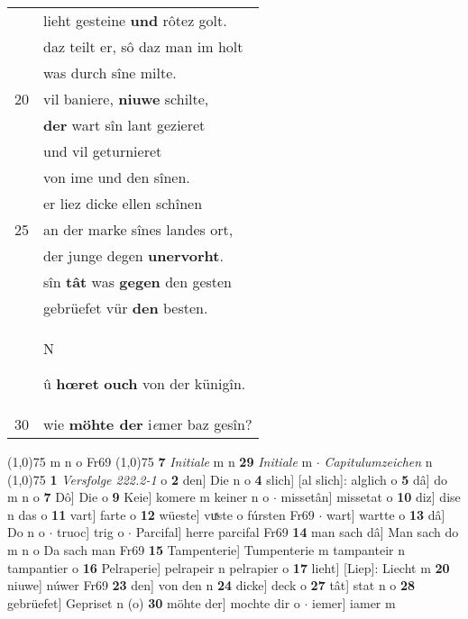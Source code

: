 \documentclass[8pt,a4paper,notitlepage]{article}
\begin{document}
\begin{table}[ht]
\begin{minipage}[t]{0.5\linewidth}
\begin{tabular}{rl}
 & lieht gesteine \textbf{und} rôtez golt.\\ 
 & daz teilt er, sô daz man im holt\\ 
 & was durch sîne milte.\\ 
20 & vil baniere, \textbf{niuwe} schilte,\\ 
 & \textbf{der} wart sîn lant gezieret\\ 
 & und vil geturnieret\\ 
 & von ime und den sînen.\\ 
 & er liez dicke ellen schînen\\ 
25 & an der marke sînes landes ort,\\ 
 & der junge degen \textbf{unervorht}.\\ 
 & sîn \textbf{tât} was \textbf{gegen} den gesten\\ 
 & gebrüefet vür \textbf{den} besten.\\ 
 & \begin{large}N\end{large}û \textbf{hœret} \textbf{ouch} von der künigîn.\\ 
30 & wie \textbf{möhte der} i\textit{e}mer baz gesîn?\\ 
\end{tabular}
\scriptsize
\line(1,0){75} \newline
m n o Fr69 \newline
\line(1,0){75} \newline
\textbf{7} \textit{Initiale} m n  \textbf{29} \textit{Initiale} m   $\cdot$ \textit{Capitulumzeichen} n  \newline
\line(1,0){75} \newline
\textbf{1} \textit{Versfolge 222.2-1} o  \textbf{2} den] Die n o \textbf{4} slich] [al slich]: alglich o \textbf{5} dâ] do m n o \textbf{7} Dô] Die o \textbf{9} Keie] komere m keiner n o  $\cdot$ missetân] missetat o \textbf{10} diz] dise n das o \textbf{11} vart] farte o \textbf{12} wüeste] vuͯste o fúrsten Fr69  $\cdot$ wart] wartte o \textbf{13} dâ] Do n o  $\cdot$ truoc] trig o  $\cdot$ Parcifal] herre parcifal Fr69 \textbf{14} man sach dâ] Man sach do m n o Da sach man Fr69 \textbf{15} Tampenterie] Tumpenterie m tampanteir n tampantier o \textbf{16} Pelraperie] pelrapeir n pelrapier o \textbf{17} lieht] [Liep]: Liecht m \textbf{20} niuwe] núwer Fr69 \textbf{23} den] von den n \textbf{24} dicke] deck o \textbf{27} tât] stat n o \textbf{28} gebrüefet] Gepriset n (o) \textbf{30} möhte der] mochte dir o  $\cdot$ iemer] iamer m \newline
\end{minipage}
\end{table}
\end{document}
